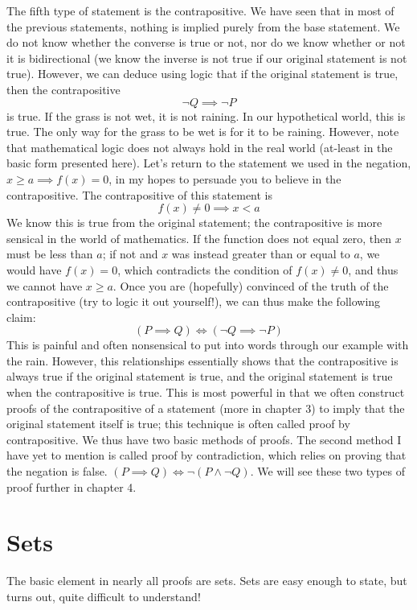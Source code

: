 The fifth type of statement is the contrapositive. We have seen that in most of the previous statements, nothing is implied purely from the base statement. We do not know whether the converse is true or not, nor do we know whether or not it is bidirectional (we know the inverse is not true if our original statement is not true). However, we can deduce using logic that if the original statement is true, then the contrapositive 
\[\neg Q \implies \neg P\] 
\noindent is true. If the grass is not wet, it is not raining. In our hypothetical world, this is true. The only way for the grass to be wet is for it to be raining. However, note that mathematical logic does not always hold in the real world (at-least in the basic form presented here). Let's return to the statement we used in the negation, $x\geq a \implies f(x) = 0$, in my hopes to persuade you to believe in the contrapositive. The contrapositive of this statement is 
\[f(x) \neq 0 \implies x < a \]
\noindent We know this is true from the original statement; the contrapositive is more sensical in the world of mathematics. If the function does not equal zero, then $x$ must be less than $a$; if not and $x$ was instead greater than or equal to $a$, we would have $f(x)=0$, which contradicts the condition of $f(x) \neq 0$, and thus we cannot have $x \geq a$. Once you are (hopefully) convinced of the truth of the contrapositive (try to logic it out yourself!), we can thus make the following claim:
\[(P \implies Q) \iff (\neg Q \implies \neg P)\]
\noindent This is painful and often nonsensical to put into words through our example with the rain. However, this relationships essentially shows that the contrapositive is always true if the original statement is true, and the original statement is true when the contrapositive is true. This is most powerful in that we often construct proofs of the contrapositive of a statement (more in chapter 3) to imply that the original statement itself is true; this technique is often called proof by contrapositive. We thus have two basic methods of proofs. The second method I have yet to mention is called proof by contradiction, which relies on proving that the negation is false. $(P \implies Q) \iff \neg(P \land \neg Q)$. We will see these two types of proof further in chapter 4.

\section{Sets}
The basic element in nearly all proofs are sets. Sets are easy enough to state, but turns out, quite difficult to understand! 


